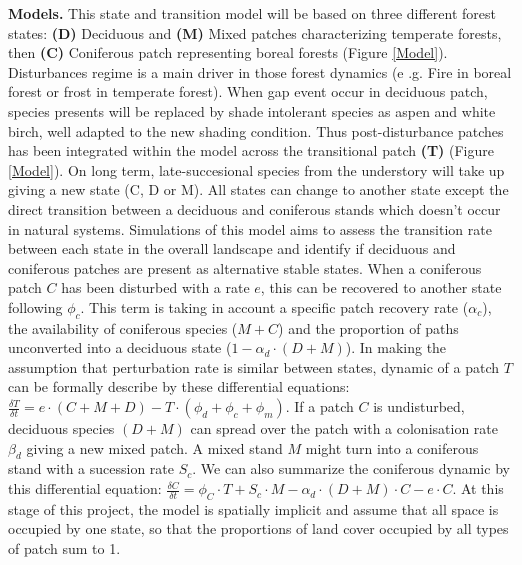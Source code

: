\textbf{Models.} This state and transition model will be based on three
different forest states: \textbf{(D)} Deciduous and \textbf{(M)} Mixed patches
characterizing temperate forests, then \textbf{(C)} Coniferous patch
representing boreal forests (Figure \ref{Model}). Disturbances regime is a main
driver in those forest dynamics (e .g. Fire in boreal forest or frost in
temperate forest). When gap event occur in deciduous patch, species presents
will be replaced by shade intolerant species as aspen and white birch, well
adapted to the new shading condition. Thus post-disturbance patches has been
integrated within the model across the transitional patch \textbf{(T)} (Figure
\ref{Model}).  On long term, late-succesional species from the understory will
take up giving a new state (C, D or M). All states can change to another state
except the direct transition between a deciduous and coniferous stands which
doesn't occur in natural systems. Simulations of this model aims to assess the
transition rate between each state in the overall landscape and identify if
deciduous and coniferous patches are present as alternative stable states. When
a coniferous patch $C$ has been disturbed with a rate $e$, this can be recovered
to another state following $\phi_c$. This term is taking in account a specific
patch recovery rate ($\alpha_{c}$), the availability of coniferous species
($M+C$) and the proportion of paths unconverted into a deciduous state ($1-
\alpha_d \cdot (D +M)$). In making the assumption that perturbation rate is
similar between states, dynamic of a patch $T$ can be formally describe by these
differential equations: $\frac{\delta T}{\delta t} = e \cdot (C+M+D) - T \cdot
(\phi_d + \phi_c + \phi_m)$. If a patch $C$ is undisturbed, deciduous species
$(D+M)$ can spread over the patch with a colonisation rate $\beta_d$ giving a
new mixed patch. A mixed stand $M$ might turn into a coniferous stand with a
sucession rate $S_c$.  We can also summarize the coniferous dynamic by this
differential equation: $\frac{\delta C}{\delta t} = \phi_C \cdot T + S_c \cdot M
- \alpha_d \cdot (D+M)\cdot C - e \cdot C$. At this stage of this project, the
model is spatially implicit and assume that all space is occupied by one state,
so that the proportions of land cover occupied by all types of patch sum to 1.\\


